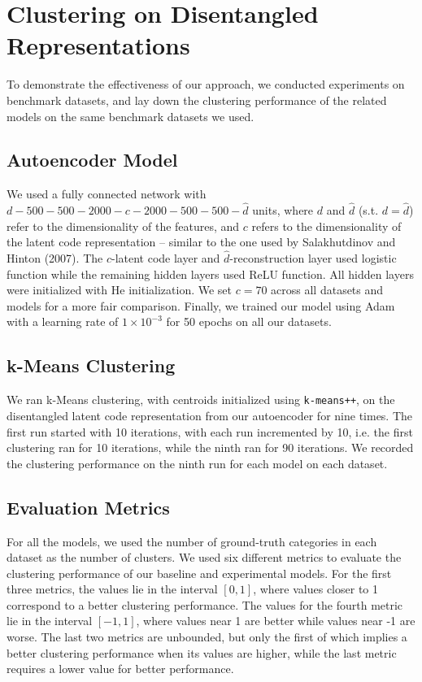 \documentclass[conference]{IEEEtran}
\begin{document}
\section{Clustering on Disentangled Representations}\label{section:clustering_disentangled_representations}
To demonstrate the effectiveness of our approach, we conducted experiments on benchmark datasets, and lay down the clustering performance of the related models on the same benchmark datasets we used.

\subsection{Autoencoder Model}
We used a fully connected network with $d-500-500-2000-c-2000-500-500-\hat{d}$ units, where $d$ and $\hat{d}$ (s.t. $d = \hat{d}$) refer to the dimensionality of the features, and $c$ refers to the dimensionality of the latent code representation -- similar to the one used by Salakhutdinov and Hinton (2007)\cite{salakhutdinov2007learning}. The $c$-latent code layer and $\hat{d}$-reconstruction layer used logistic function while the remaining hidden layers used ReLU function\cite{nair2010rectified}. All hidden layers were initialized with He initialization\cite{he2015delving}. We set $c = 70$ across all datasets and models for a more fair comparison. Finally, we trained our model using Adam\cite{kingma2014adam} with a learning rate of $1\times10^{-3}$ for 50 epochs on all our datasets.

\subsection{k-Means Clustering}
We ran k-Means clustering, with centroids initialized using \texttt{k-means++}\cite{arthur2007kmeans}, on the disentangled latent code representation from our autoencoder for nine times. The first run started with 10 iterations, with each run incremented by 10, i.e. the first clustering ran for 10 iterations, while the ninth ran for 90 iterations. We recorded the clustering performance on the ninth run for each model on each dataset.

\subsection{Evaluation Metrics}
For all the models, we used the number of ground-truth categories in each dataset as the number of clusters. We used six different metrics to evaluate the clustering performance of our baseline and experimental models. For the first three metrics, the values lie in the interval $[0, 1]$, where values closer to 1 correspond to a better clustering performance. The values for the fourth metric lie in the interval $[-1, 1]$, where values near 1 are better while values near -1 are worse. The last two metrics are unbounded, but only the first of which implies a better clustering performance when its values are higher, while the last metric requires a lower value for better performance.
\end{document}
